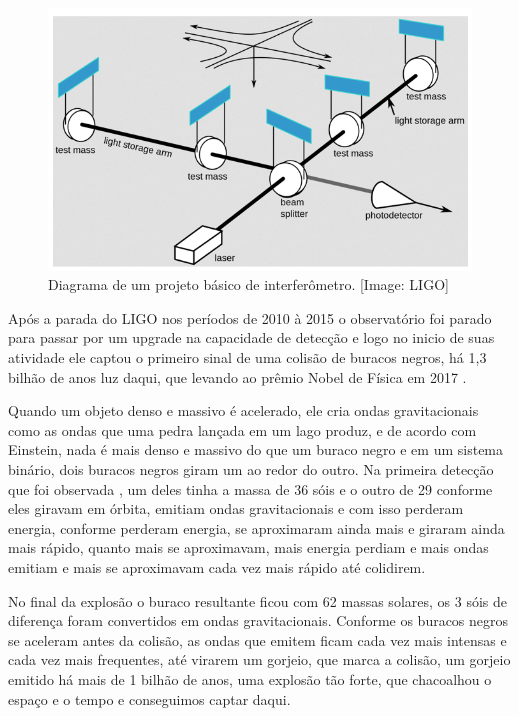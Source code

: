 \begin{figure}[ht]
\centering
\includegraphics[width=1\textwidth]{figuras/interferometro.png}
\caption{Diagrama de um projeto básico de interferômetro. [Image: LIGO]}
\label{figinterferometer}
\end{figure}
 
Após a parada do LIGO nos períodos de 2010 à 2015 o observatório foi parado para passar por um upgrade na capacidade de detecção e logo no inicio de suas atividade ele captou o primeiro sinal de uma colisão de buracos negros, há 1,3 bilhão de anos luz daqui, que levando ao prêmio Nobel de Física em 2017 \cite{abbott2016observation}. 
 
Quando um objeto denso e massivo é acelerado, ele cria ondas gravitacionais como as ondas que uma pedra lançada em um lago produz, e de acordo com Einstein, nada é mais denso e massivo do que um buraco negro e em um sistema binário, dois buracos negros giram um ao redor do outro. Na primeira detecção que foi observada \cite{abbott2016observation}, um deles tinha a massa de 36 sóis e o outro de 29 conforme eles giravam em órbita, emitiam ondas gravitacionais e com isso perderam energia, conforme perderam energia, se aproximaram ainda mais e giraram ainda mais rápido, quanto mais se aproximavam, mais energia perdiam e mais ondas emitiam e mais se aproximavam cada vez mais rápido até colidirem.

No final da explosão o buraco resultante ficou com 62 massas solares, os 3 sóis de diferença foram convertidos em ondas gravitacionais. Conforme os buracos negros se aceleram antes da colisão, as ondas que emitem ficam cada vez mais intensas e cada vez mais frequentes, até virarem um gorjeio, que marca a colisão, um gorjeio emitido há mais de 1 bilhão de anos, uma explosão tão forte, que chacoalhou o espaço e o tempo e conseguimos captar daqui.

